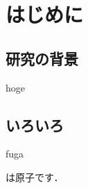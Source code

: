 \documentclass[10pt,a4paper]{jsarticle}
\begin{document}

\section{はじめに}

\subsection{研究の背景}
hoge\cite{hoge}

\subsection{いろいろ}
fuga


は原子です\cite{irasutoya}．
\end{document}
